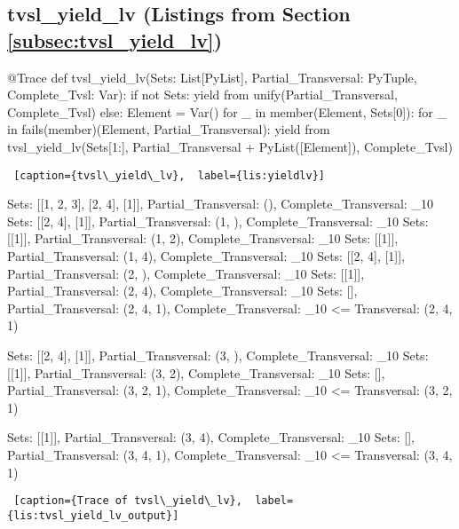 \subsection{tvsl\_yield\_lv (Listings from Section \ref{subsec:tvsl_yield_lv})} \label{appsubsec:tvsl_yield_lv}

\begin{minipage}{\linewidth}   \hrulefill
\begin{python}[numbers=left]
@Trace
def tvsl_yield_lv(Sets: List[PyList], Partial_Transversal: PyTuple, Complete_Tvsl: Var):
  if not Sets:
    yield from unify(Partial_Transversal, Complete_Tvsl)
  else:
    Element = Var()
    for _ in member(Element, Sets[0]):
      for _ in fails(member)(Element, Partial_Transversal):
        yield from tvsl_yield_lv(Sets[1:], Partial_Transversal + PyList([Element]), Complete_Tvsl)
\end{python}
\begin{lstlisting} [caption={tvsl\_yield\_lv},  label={lis:yieldlv}]
\end{lstlisting}
\end{minipage}

\noindent
\begin{minipage}{\linewidth} \largev 
\begin{python}
Sets: [[1, 2, 3], [2, 4], [1]], Partial_Transversal: (), Complete_Transversal: _10
  Sets: [[2, 4], [1]], Partial_Transversal: (1, ), Complete_Transversal: _10
    Sets: [[1]], Partial_Transversal: (1, 2), Complete_Transversal: _10
    Sets: [[1]], Partial_Transversal: (1, 4), Complete_Transversal: _10
  Sets: [[2, 4], [1]], Partial_Transversal: (2, ), Complete_Transversal: _10
    Sets: [[1]], Partial_Transversal: (2, 4), Complete_Transversal: _10
      Sets: [], Partial_Transversal: (2, 4, 1), Complete_Transversal: _10 <=
Transversal: (2, 4, 1)

  Sets: [[2, 4], [1]], Partial_Transversal: (3, ), Complete_Transversal: _10
    Sets: [[1]], Partial_Transversal: (3, 2), Complete_Transversal: _10
      Sets: [], Partial_Transversal: (3, 2, 1), Complete_Transversal: _10 <=
Transversal: (3, 2, 1)

    Sets: [[1]], Partial_Transversal: (3, 4), Complete_Transversal: _10
      Sets: [], Partial_Transversal: (3, 4, 1), Complete_Transversal: _10 <=
Transversal: (3, 4, 1)
\end{python}
\begin{lstlisting} [caption={Trace of tvsl\_yield\_lv},  label={lis:tvsl_yield_lv_output}]
\end{lstlisting}
\end{minipage}


